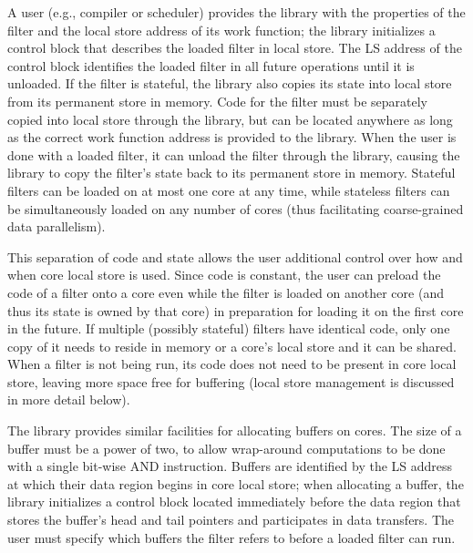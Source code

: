 A user (e.g., compiler or scheduler) provides the library with the
properties of the filter and the local store address of its work
function; the library initializes a control block that describes the
loaded filter in local store. The LS address of the control block
identifies the loaded filter in all future operations until it is
unloaded. If the filter is stateful, the library also copies its state
into local store from its permanent store in memory. Code for the
filter must be separately copied into local store through the library,
but can be located anywhere as long as the correct work function
address is provided to the library. When the user is done with a
loaded filter, it can unload the filter through the library, causing
the library to copy the filter's state back to its permanent store in
memory. Stateful filters can be loaded on at most one core at any
time, while stateless filters can be simultaneously loaded on any
number of cores (thus facilitating coarse-grained data parallelism).

This separation of code and state allows the user additional control
over how and when core local store is used. Since code is constant,
the user can preload the code of a filter onto a core even while the
filter is loaded on another core (and thus its state is owned by that
core) in preparation for loading it on the first core in the
future. If multiple (possibly stateful) filters have identical code,
only one copy of it needs to reside in memory or a core's local store
and it can be shared. When a filter is not being run, its code does
not need to be present in core local store, leaving more space free
for buffering (local store management is discussed in more detail
below).

The library provides similar facilities for allocating buffers on
cores. The size of a buffer must be a power of two, to allow
wrap-around computations to be done with a single bit-wise
\textsf{AND} instruction. Buffers are identified by the LS address
at which their data region begins in core local store; when allocating
a buffer, the library initializes a control block located immediately
before the data region that stores the buffer's head and tail pointers
and participates in data transfers. The user must specify which
buffers the filter refers to before a loaded filter can run.

